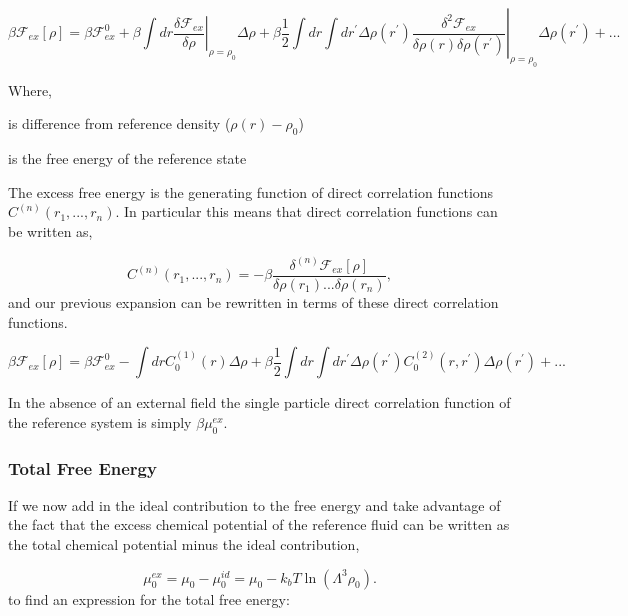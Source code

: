 \documentclass[11pt]{article}
\renewcommand{\d}{\delta}
\newcommand{\F}{\mathcal{F}}
\renewcommand{\l}{\left}
\renewcommand{\r}{\right}
\newcommand{\f}{\frac}
\begin{document}
\begin{equation}
    \beta\F_{ex}[\rho] = \beta\F_{ex}^0 +
    \beta\int dr \left.\frac{\d\F_{ex}}{\d\rho}\right\vert_{\rho = \rho_0} \Delta\rho
    + \beta\f{1}{2}\int dr \int dr^\prime \Delta\rho(r^\prime)\l.\f{\d^2\F_{ex}}{\d\rho(r)\d\rho(r^\prime)}\r\vert_{\rho=\rho_0}\Delta\rho(r^\prime) + ...
\end{equation}

Where,
\begin{description}[labelindent=10pt, labelsep=10pt]
    \item[$\Delta\rho$] is difference from reference density ($\rho(r) - \rho_0$)
    \item[$\F_{ex}^0$] is the free energy of the reference state
\end{description}

The excess free energy is the generating function of direct correlation functions $C^(n)(r_1, ..., r_n)$.
In particular this means that direct correlation functions can be written as,

\begin{equation}
    C^{(n)}(r_1, ..., r_n) = -\beta \f{\d^{(n)}\F_{ex}[\rho]}{\d\rho(r_1)...\d\rho(r_n)},
\end{equation}
and our previous expansion can be rewritten in terms of these direct correlation functions.

\begin{equation}
    \beta\F_{ex}[\rho] = \beta\F_{ex}^0 - \int dr C^{(1)}_0(r) \Delta\rho
    + \beta\f{1}{2}\int dr \int dr^\prime \Delta\rho(r^\prime)C^{(2)}_0(r, r^\prime)\Delta\rho(r^\prime) + ...
\end{equation}

In the absence of an external field the single particle direct correlation function of the reference system is simply $\beta\mu^{ex}_0$.

\subsubsection{Total Free Energy}
If we now add in the ideal contribution to the free energy and take advantage of the fact that the excess chemical potential of the reference fluid can be written as the total chemical potential minus the ideal contribution,

\begin{equation}
    \mu^{ex}_0 = \mu_0 - \mu^{id}_0 = \mu_0 - k_bT\ln(\Lambda^3\rho_0).
\end{equation}
to find an expression for the total free energy:
\end{document}
